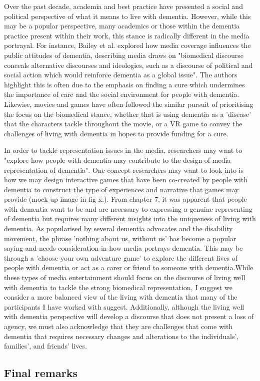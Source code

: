 Over the past decade, academia and best practice have presented a social and political perspective of what it means to live with dementia. However, while this may be a popular perspective, many academics or those within the dementia practice present within their work, this stance is radically different in the media portrayal. For instance, Bailey et al. explored how media coverage influences the public attitudes of dementia, describing media draws on "biomedical discourse conceals alternative discourses and ideologies, such as a discourse of political and social action which would reinforce dementia as a global issue". The authors highlight this is often due to the emphasis on finding a cure which undermines the importance of care and the social environment for people with dementia. Likewise, movies and games have often followed the similar pursuit of prioritising the focus on the biomedical stance, whether that is using dementia as a 'disease' that the characters tackle throughout the movie, or a VR game to convey the challenges of living with dementia in hopes to provide funding for a cure.

In order to tackle representation issues in the media, researchers may want to "explore how people with dementia may contribute to the design of media representation of dementia". One concept researchers may want to look into is how we may design interactive games that have been co-created by people with dementia to construct the type of experiences and narrative that games may provide (mock-up image in fig x.). From chapter 7, it was apparent that people with dementia want to be and are necessary to expressing a genuine representing of dementia but requires many different insights into the uniqueness of living with dementia. As popularised by several dementia advocates and the disability movement, the phrase 'nothing about us, without us' has become a popular saying and needs consideration in how media portrays dementia. This may be through a 'choose your own adventure game' to explore the different lives of people with dementia or act as a carer or friend to someone with dementia.While these types of media entertainment should focus on the discourse of living well with dementia to tackle the strong biomedical representation, I suggest we consider a more balanced view of the living with dementia that many of the participants I have worked with suggest. Additionally, although the living well with dementia perspective will develop a discourse that does not present a loss of agency, we must also acknowledge that they are challenges that come with dementia that requires necessary changes and alterations to the individuals', families', and friends' lives. 

\subsection{Final remarks}
\label{Discussion:FinalRemarks}
